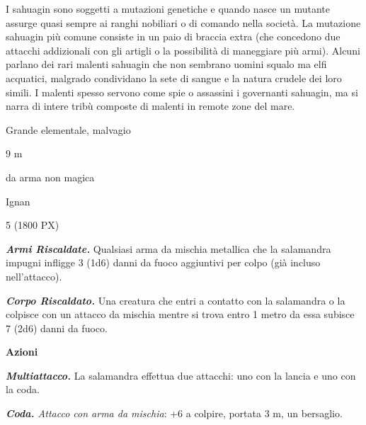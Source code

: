 \begin{multicols}{2}
{I sahuagin sono soggetti a mutazioni genetiche e quando nasce un mutante assurge quasi sempre ai ranghi nobiliari o di comando nella società. La mutazione sahuagin più comune consiste in un paio di braccia extra (che concedono due attacchi addizionali con gli artigli o la possibilità di maneggiare più armi). Alcuni parlano dei rari malenti sahuagin che non sembrano uomini squalo ma elfi acquatici, malgrado condividano la sete di sangue e la natura crudele dei loro simili. I malenti spesso servono come spie o assassini i governanti sahuagin, ma si narra di intere tribù composte di malenti in remote zone del mare.

\begin{description}[noitemsep, topsep=0pt, parsep=0pt, partopsep=0pt, itemsep=1pt, leftmargin=2.35cm,  labelwidth=2.2cm, itemindent=0cm, listparindent=0pt] %
\setlength{\baselineskip}{10pt}
\item[\textbf{Taglia/Tipo}] Grande elementale, malvagio
\item[\textbf{Caratt.}] 
\item[\textbf{Punti Ferita}] 
\item[\textbf{Movimento}] 9 m
\item[\textbf{Tiri Salvez.}] 
\item[\textbf{Res. Danni}] da arma non magica
\item[\textbf{Sensi}] 
\item[\textbf{Linguaggi}] Ignan
\item[\textbf{Sfida}] 5 (1800 PX)
\end{description}
\smallskip

\emph{\textbf{Armi Riscaldate.}} Qualsiasi arma da mischia metallica che la salamandra impugni infligge 3 (1d6) danni da fuoco aggiuntivi per colpo (già incluso nell'attacco).

\emph{\textbf{Corpo Riscaldato.}} Una creatura che entri a contatto con la salamandra o la colpisce con un attacco da mischia mentre si trova entro 1 metro da essa subisce 7 (2d6) danni da fuoco.

\textbf{Azioni}

\emph{\textbf{Multiattacco.}} La salamandra effettua due attacchi: uno con la lancia e uno con la coda.

\emph{\textbf{Coda.} Attacco con arma da mischia}: +6 a colpire, portata 3 m, un bersaglio.

}
\end{multicols}
